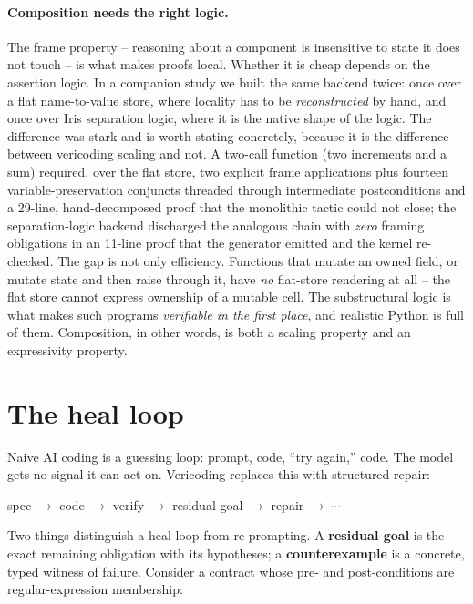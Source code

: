 \documentclass[sigconf,nonacm]{acmart}
\begin{document}
\paragraph{Composition needs the right logic.} The frame property -- reasoning
about a component is insensitive to state it does not touch -- is what makes
proofs local. Whether it is cheap depends on the assertion logic. In a companion
study we built the same backend twice: once over a flat name-to-value store,
where locality has to be \emph{reconstructed} by hand, and once over Iris
separation logic, where it is the native shape of the logic. The difference was
stark and is worth stating concretely, because it is the difference between
vericoding scaling and not. A two-call function (two increments and a sum)
required, over the flat store, two explicit frame applications plus fourteen
variable-preservation conjuncts threaded through intermediate postconditions and
a 29-line, hand-decomposed proof that the monolithic tactic could not close; the
separation-logic backend discharged the analogous chain with \emph{zero} framing
obligations in an 11-line proof that the generator emitted and the kernel
re-checked. The gap is not only efficiency. Functions that mutate an owned field,
or mutate state and then raise through it, have \emph{no} flat-store rendering at
all -- the flat store cannot express ownership of a mutable cell. The
substructural logic is what makes such programs \emph{verifiable in the first
place}, and realistic Python is full of them. Composition, in other words, is
both a scaling property and an expressivity property.

\section{The heal loop}
\label{sec:heal}

Naive AI coding is a guessing loop: prompt, code, ``try again,'' code. The model
gets no signal it can act on. Vericoding replaces this with structured repair:
\begin{center}
spec $\rightarrow$ code $\rightarrow$ verify $\rightarrow$ residual goal $\rightarrow$ repair $\rightarrow\ \cdots$
\end{center}

Two things distinguish a heal loop from re-prompting. A \textbf{residual goal} is
the exact remaining obligation with its hypotheses; a \textbf{counterexample} is
a concrete, typed witness of failure. Consider a contract whose pre- and
post-conditions are regular-expression membership:
\end{document}
